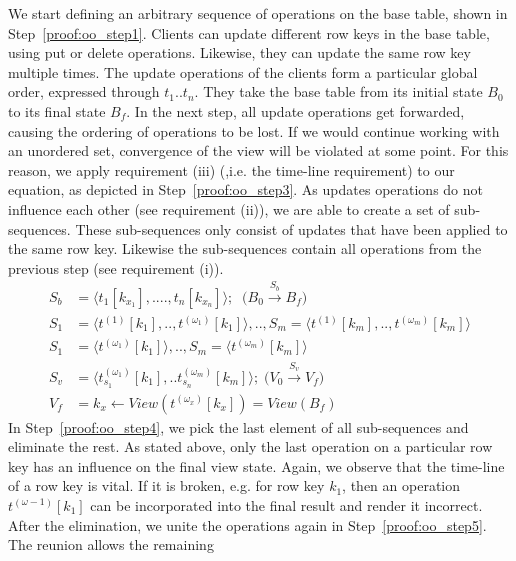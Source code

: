 We start defining an arbitrary sequence of operations on the base table, 
shown in Step~\ref{proof:oo_step1}. Clients can update different row 
keys in the base table, using put or delete operations. Likewise, they 
can update the same row key multiple times. The update operations of the 
clients form a particular global order, expressed through $t_1..t_n$. 
They take the base table from its initial state $B_0$ to its final state 
$B_f$. In the next step, all update operations get forwarded, causing 
the ordering of operations to be lost. If we would continue working with 
an unordered set, convergence of the view will be violated at some 
point. For this reason, we apply requirement (iii) (,i.e. the time-line 
requirement) to our equation, as depicted in Step~\ref{proof:oo_step3}. 
As updates operations do not influence each other (see requirement 
(ii)), we are able to create a set of sub-sequences. These 
sub-sequences only consist of updates that have been applied to the same 
row key. Likewise the sub-sequences contain all operations from the 
previous step (see requirement (i)). 
%
\begin{subequations}
  \begin{align}
 S_b&=\langle t_1[k_{x_1}],....,t_n[k_{x_n}] \rangle;\;\;\Big(B_0 \overset{S_b}{\rightarrow}B_f\Big) \label{proof:oo_step1}\\ 
 S_1&=\langle t^{(1)}[k_{1}],..,t^{(\omega_1)}[k_{1}]\rangle,..,S_m=\langle t^{(1)}[k_{m}],..,t^{(\omega_m)}[k_{m}]\rangle\label{proof:oo_step3}\\
  S_1&=\langle t^{(\omega_1)}[k_{1}]\rangle,..,S_m=\langle t^{(\omega_m)}[k_{m}]\rangle\label{proof:oo_step4}\\
 S_v&=\langle t_{s_1}^{(\omega_1)}[k_{1}],..t_{s_n}^{(\omega_m)}[k_{m}]\rangle;\; \Big(V_0\overset{S_v}{\rightarrow}V_f\Big)\label{proof:oo_step5}\\
 	V_f&=k_x\leftarrow View(t^{(\omega_x)}[k_x])=View(B_f)\label{proof:oo_step6}
  \end{align}
\end{subequations}
%
In Step~\ref{proof:oo_step4}, we pick the last element of all 
sub-sequences and eliminate the rest. As stated above, only the last 
operation on a particular row key has an influence on the final view 
state. Again, we observe that the time-line of a row key is vital. If it 
is broken, e.g. for row key $k_1$, then an operation 
$t^{(\omega-1)}[k_{1}]$ can be incorporated into the final result and 
render it incorrect. After the elimination, we unite the operations 
again in Step~\ref{proof:oo_step5}. The reunion allows the remaining 
